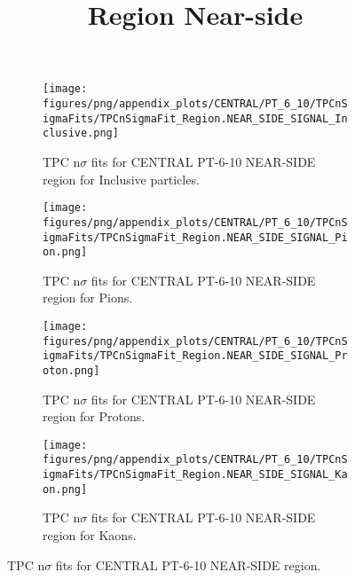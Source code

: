             \begin{figure}[H]
                \title{Region Near-side}
                \begin{subfigure}[b]{0.5\textwidth}
                    \centering
                    \texttt{[image: figures/png/appendix\_plots/CENTRAL/PT\_6\_10/TPCnSigmaFits/TPCnSigmaFit\_Region.NEAR\_SIDE\_SIGNAL\_Inclusive.png]}
                    \caption{TPC n$\sigma$ fits for CENTRAL PT-6-10 NEAR-SIDE region for Inclusive particles.}
                    \label{fig:appendix_CENTRAL_PT-6-10_NEAR_SIDE_SIGNAL_Inclusive}
                \end{subfigure}
                \begin{subfigure}[b]{0.5\textwidth}
                    \centering
                    \texttt{[image: figures/png/appendix\_plots/CENTRAL/PT\_6\_10/TPCnSigmaFits/TPCnSigmaFit\_Region.NEAR\_SIDE\_SIGNAL\_Pion.png]}
                    \caption{TPC n$\sigma$ fits for CENTRAL PT-6-10 NEAR-SIDE region for Pions.}
                    \label{fig:appendix_CENTRAL_PT-6-10_NEAR_SIDE_SIGNAL_Pion}
                \end{subfigure}
                \begin{subfigure}[b]{0.5\textwidth}
                    \centering
                    \texttt{[image: figures/png/appendix\_plots/CENTRAL/PT\_6\_10/TPCnSigmaFits/TPCnSigmaFit\_Region.NEAR\_SIDE\_SIGNAL\_Proton.png]}
                    \caption{TPC n$\sigma$ fits for CENTRAL PT-6-10 NEAR-SIDE region for Protons.}
                    \label{fig:appendix_CENTRAL_PT-6-10_NEAR_SIDE_SIGNAL_Proton}
                \end{subfigure}
                \begin{subfigure}[b]{0.5\textwidth}
                    \centering
                    \texttt{[image: figures/png/appendix\_plots/CENTRAL/PT\_6\_10/TPCnSigmaFits/TPCnSigmaFit\_Region.NEAR\_SIDE\_SIGNAL\_Kaon.png]}
                    \caption{TPC n$\sigma$ fits for CENTRAL PT-6-10 NEAR-SIDE region for Kaons.}
                    \label{fig:appendix_CENTRAL_PT-6-10_NEAR_SIDE_SIGNAL_Kaon}
                \end{subfigure}
                \caption{TPC n$\sigma$ fits for CENTRAL PT-6-10 NEAR-SIDE region.}
                \label{fig:appendix_CENTRAL_PT-6-10_NEAR_SIDE_SIGNAL}
            \end{figure}
